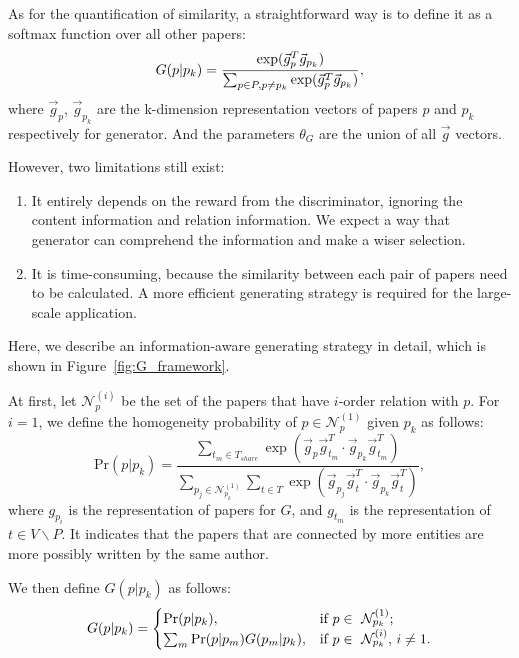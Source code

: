 \documentclass[letterpaper]{article}
\begin{document}
As for the quantification of similarity, a straightforward way is to define it as a softmax function over all other papers:
\begin{equation}
G(p|p_k)=\frac{\exp(\vec{g}_{p}^T\vec{g}_{p_k})}{\sum_{p \in P, p\neq p_k}\exp(\vec{g}_{p}^T\vec{g}_{p_k})},
\label{eq:g_softmax}
\vspace*{1pt}
\end{equation}
where $\vec{g}_{p}$, $\vec{g}_{p_k}$ are the k-dimension representation vectors of papers $p$ and $p_k$ respectively for generator.
And the parameters $\theta_G$ are the union of all $\vec{g}$ vectors.

However, two limitations still exist:
\begin{enumerate}
\item It entirely depends on the reward from the discriminator, ignoring the content information and relation information.
We expect a way that generator can comprehend the information and make a wiser selection.

\item  It is time-consuming, because the similarity between each pair of papers need to be calculated. A more efficient generating strategy is required for the large-scale application.

\end{enumerate}

Here, we describe an information-aware generating strategy in detail, which is shown in Figure~\ref{fig:G_framework}.

At first, let $\mathcal{N}_p^{(i)}$ be the set of the papers that have $i$-order relation with $p$.
For $i=1$, we define the homogeneity probability of $p \in \mathcal{N}_p^{(1)}$ given $p_k$ as follows:
\begin{equation}
\text{Pr}(p|p_k) = \frac{\sum_{t_m \in T_{share}}\exp(\vec{g}_{p}\vec{g}_{t_m}^T\cdot
\vec{g}_{p_k}\vec{g}_{t_m}^T)}{\sum_{p_j \in \mathcal{N}_{p_k}^{(1)}}\sum_{t \in T}
\exp(\vec{g}_{p_j}\vec{g}_{t}^T\cdot \vec{g}_{p_k}\vec{g}_{t}^T)},
\label{eq:pairwise}
\end{equation}
where $g_{p_i}$ is the representation of papers for $G$, and $g_{t_m}$ is the representation of $t \in V \backslash P$.
It indicates that the papers that are connected by more entities are more possibly written by the same author.

We then define $G(p|p_k)$ as follows:
{\small
\begin{align}
\centering
G(p|p_k) = \begin{cases} \text{Pr}(p|p_k), & \mbox{if } p \in \mbox{ $\mathcal{N}_{p_k}^{(1)}$}; \label{eq:G}
\\ \sum_m\text{Pr}(p|p_m)G(p_m|p_k), & \mbox{if } p \in \mbox{ $\mathcal{N}_{p_k}^{(i)}$, $i\neq 1$}.
\end{cases}
\end{align}}
\end{document}
